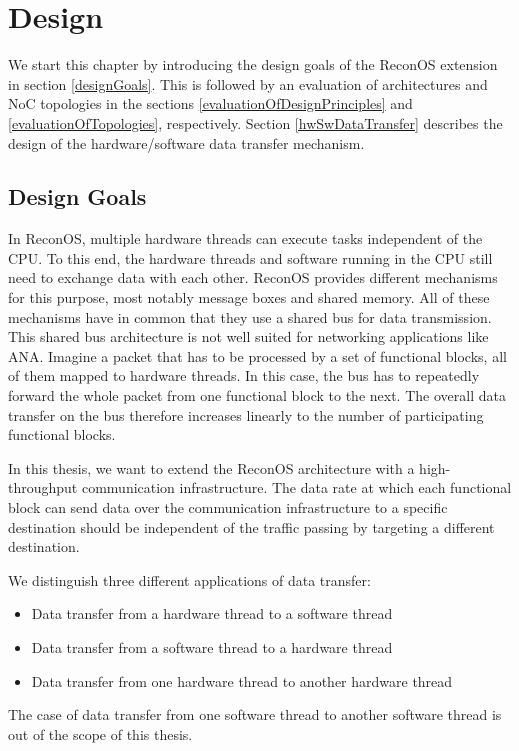 \chapter{\label{design}Design}

We start this chapter by introducing the design goals of the ReconOS extension in section \ref{designGoals}. This is followed by an evaluation of architectures and NoC topologies in the sections \ref{evaluationOfDesignPrinciples} and \ref{evaluationOfTopologies}, respectively. Section \ref{hwSwDataTransfer} describes the design of the hardware/software data transfer mechanism.

\section{\label{designGoals}Design Goals}

In ReconOS, multiple hardware threads can execute tasks independent of the CPU. To this end, the hardware threads and software running in the CPU still need to exchange data with each other. ReconOS provides different mechanisms for this purpose, most notably message boxes and shared memory. All of these mechanisms have in common that they use a shared bus for data transmission. This shared bus architecture is not well suited for networking applications like ANA. Imagine a packet that has to be processed by a set of functional blocks, all of them mapped to hardware threads. In this case, the bus has to repeatedly forward the whole packet from one functional block to the next. The overall data transfer on the bus therefore increases linearly to the number of participating functional blocks.

In this thesis, we want to extend the ReconOS architecture with a high-throughput communication infrastructure. The data rate at which each functional block can send data over the communication infrastructure to a specific destination should be independent of the traffic passing by targeting a different destination.

We distinguish three different applications of data transfer:
\begin{itemize}
	\item Data transfer from a hardware thread to a software thread
	\item Data transfer from a software thread to a hardware thread
	\item Data transfer from one hardware thread to another hardware thread
\end{itemize}
The case of data transfer from one software thread to another software thread is out of the scope of this thesis.

